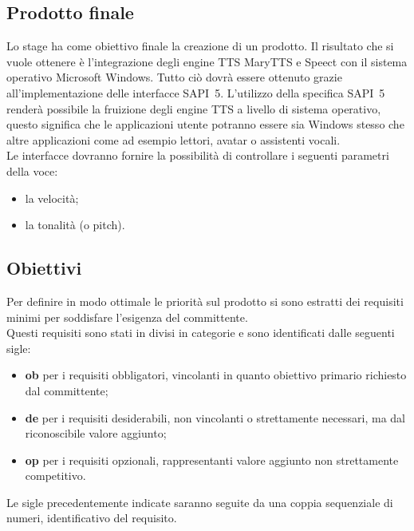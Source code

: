 \subsection{Prodotto finale}
Lo stage ha come obiettivo finale la creazione di un prodotto.
Il risultato che si vuole ottenere è l'integrazione degli engine TTS MaryTTS e Speect con il sistema operativo Microsoft Windows. Tutto ciò dovrà essere ottenuto grazie all'implementazione delle interfacce SAPI~5.
L'utilizzo della specifica SAPI~5 renderà possibile la fruizione degli engine TTS a livello di sistema operativo, questo significa che le applicazioni utente potranno essere sia Windows stesso che altre applicazioni come ad esempio lettori, avatar o assistenti vocali.\\
Le interfacce dovranno fornire la possibilità di controllare i seguenti parametri della voce:
\begin{itemize}
	\item la velocità;
	\item la tonalità (o pitch).
\end{itemize}


\subsection{Obiettivi}

Per definire in modo ottimale le priorità sul prodotto si sono estratti dei requisiti minimi per soddisfare l'esigenza del committente.\\
Questi requisiti sono stati in divisi in categorie e sono identificati dalle seguenti sigle:
\begin{itemize}
	\item \textbf{ob} per i requisiti obbligatori, vincolanti in quanto obiettivo primario
	richiesto dal committente;
	\item  \textbf{de} per i requisiti desiderabili, non vincolanti o strettamente necessari,
	ma dal riconoscibile valore aggiunto;
	\item \textbf{op} per i requisiti opzionali, rappresentanti valore aggiunto non
	strettamente competitivo.
\end{itemize}
Le sigle precedentemente indicate saranno seguite da una coppia sequenziale di numeri, identificativo del requisito.\\

